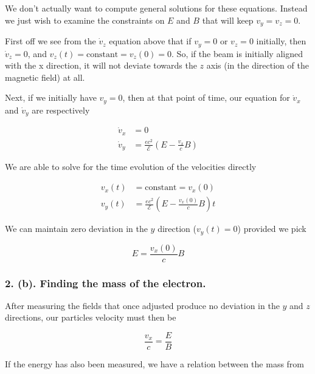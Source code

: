 We don't actually want to compute general solutions for these equations.  Instead we just wish to examine the constraints on $E$ and $B$ that will keep $v_y = v_z = 0$.

First off we see from the $\dot{v}_z$ equation above that if $v_y = 0$ or $v_z = 0$ initially, then $\dot{v}_z = 0$, and $v_z(t) = \text{constant} = v_z(0) = 0$.  So, if the beam is initially aligned with the x direction, it will not deviate towards the $z$ axis (in the direction of the magnetic field) at all.

Next, if we initially have $v_y = 0$, then at that point of time, our equation for $\dot{v}_x$ and $\dot{v}_y$ are respectively

\begin{align}\label{eqn:relElectroDynProblemSet2:370}
\dot{v}_x &= 0 \\
\dot{v}_y &= \frac{e c^2}{\mathcal{E}} \left( E - \frac{v_x}{c} B \right) 
\end{align}

We are able to solve for the time evolution of the velocities directly

\begin{align}\label{eqn:relElectroDynProblemSet2:390}
v_x(t) &= \text{constant} = v_x(0) \\
v_y(t) &= \frac{e c^2}{\mathcal{E}} \left( E - \frac{v_x(0)}{c} B \right) t
\end{align}

We can maintain zero deviation in the $y$ direction ($v_y(t) = 0$) provided we pick

\begin{equation}\label{eqn:relElectroDynProblemSet2:410}
E = \frac{v_x(0)}{c} B
\end{equation}

\subsubsection{2. (b). Finding the mass of the electron.}

After measuring the fields that once adjusted produce no deviation in the $y$ and $z$ directions, our particles velocity must then be

\begin{equation}\label{eqn:relElectroDynProblemSet2:430}
\frac{v_x}{c} = \frac{E}{B}
\end{equation}

If the energy has also been measured, we have a relation between the mass from

